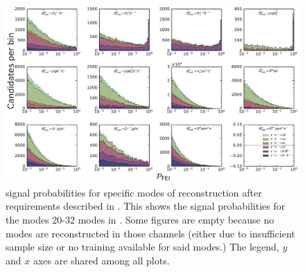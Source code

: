 \begin{figure}[htbp!]
    \ContinuedFloat
    \centering
    \includegraphics[width=1\textwidth]{figures/appendices/FEI_signal_probabilities/Bz_feiSigProbs2.pdf}
    \caption{\label{fig:feisigprobs4} \FEI signal probabilities for specific modes of \Bz reconstruction after requirements described in .
    This shows the signal probabilities for the modes 20-32 \Bz modes in .
    Some figures are empty because no modes are reconstructed in those channels (either due to insufficient sample size or no training available for said modes.)
    The legend, $y$ and $x$ axes are shared among all plots.
    }
\end{figure}